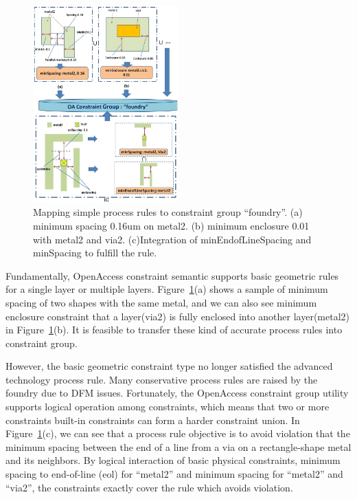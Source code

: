     
      \begin{figure}[t]
        \centering
        \includegraphics[width=0.5\textwidth]{Fig/Chapter3/SimpleRuleCon2.eps}
        \caption{Mapping simple process rules to constraint group ``foundry''. (a) minimum spacing 0.16um on metal2. (b) minimum enclosure 0.01 with metal2 and via2. (c)Integration of minEndofLineSpacing and minSpacing to fulfill the rule.}
        \label{fig:SimruleCon}
      \end{figure}
    
      Fundamentally, OpenAccess constraint semantic supports basic geometric rules for a single layer or multiple layers. Figure~\ref{fig:SimruleCon}(a) shows a sample of minimum spacing of two shapes with the same metal, and we can also see minimum enclosure constraint that a layer(via2) is fully enclosed into another layer(metal2) in Figure~\ref{fig:SimruleCon}(b). It is feasible to transfer these kind of accurate process rules into constraint group.

      However, the basic geometric constraint type no longer satisfied the advanced technology process rule. Many conservative process rules are raised by the foundry due to DFM issues. Fortunately, the OpenAccess constraint group utility supports logical operation among constraints, which means that two or more constraints built-in constraints can form a harder constraint union. In Figure~\ref{fig:SimruleCon}(c), we can see that a process rule objective is to avoid violation that the minimum spacing between the end of a line from a via on a rectangle-shape metal and its neighbors. By logical interaction of basic physical constraints, minimum spacing to end-of-line (eol) for ``metal2'' and minimum spacing for ``metal2'' and ``via2'', the constraints exactly cover the rule which avoids violation.
      
